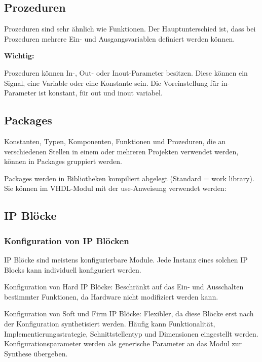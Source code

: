\subsection{Prozeduren}
Prozeduren sind sehr ähnlich wie Funktionen. Der Hauptunterschied ist, dass bei Prozeduren mehrere Ein- und Ausgangsvariablen definiert werden können.

\textbf{Wichtig: }
\begin{compactitem}
    \item Prozeduren können In-, Out- oder Inout-Parameter besitzen. Diese können ein Signal, eine Variable oder eine Konstante sein. Die Voreinstellung für in-Parameter ist konstant, für out und inout variabel.
\end{compactitem}

\subsection{Packages}
Konstanten, Typen, Komponenten, Funktionen und Prozeduren, die an verschiedenen Stellen in einem oder mehreren Projekten verwendet werden, können in Packages gruppiert werden.

Packages werden in Bibliotheken kompiliert abgelegt (Standard = work library). Sie können im VHDL-Modul mit der use-Anweisung verwendet werden:


\subsection{IP Blöcke}
\subsubsection{Konfiguration von IP Blöcken}
\begin{compactitem}
    \item IP Blöcke sind meistens konfigurierbare Module. Jede Instanz eines solchen IP Blocks kann individuell konfiguriert werden.
    \item Konfiguration von Hard IP Blöcke: Beschränkt auf das Ein- und Ausschalten bestimmter Funktionen, da Hardware nicht modifiziert werden kann.
    \item Konfiguration von Soft und Firm IP Blöcke: Flexibler, da diese Blöcke erst nach der Konfiguration synthetisiert werden. Häufig kann Funktionalität, Implementierungsstrategie, Schnittstellentyp und Dimensionen eingestellt werden. Konfigurationsparameter werden als generische Parameter an das Modul zur Synthese übergeben.
\end{compactitem}
